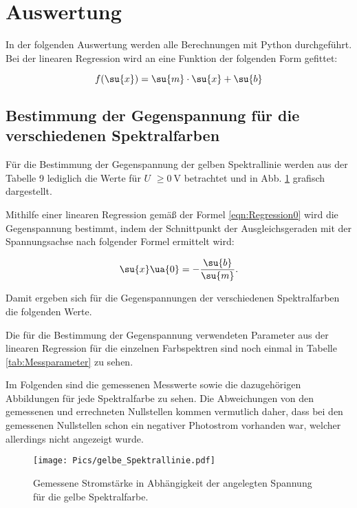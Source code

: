\section{Auswertung}

In der folgenden Auswertung werden alle Berechnungen mit Python durchgeführt.
Bei der linearen Regression wird an eine Funktion der folgenden Form gefittet:

\begin{equation}
  \label{eqn:Regression0}
  f(\su{x}) = \su{m} \cdot \su{x} + \su{b}
\end{equation}


\subsection{Bestimmung der Gegenspannung für die verschiedenen Spektralfarben}

Für die Bestimmung der Gegenspannung der gelben Spektrallinie werden aus der Tabelle
9 lediglich die Werte für $U$ $\geq \SI{0}{\volt}$ betrachtet und in
Abb. \ref{fig:Gelb} grafisch dargestellt.

Mithilfe einer linearen Regression gemäß der Formel \eqref{eqn:Regression0} wird die
Gegenspannung bestimmt, indem der Schnittpunkt der Ausgleichsgeraden mit der
Spannungsachse nach folgender Formel ermittelt wird:

\begin{equation}
  \su{x}\ua{0} = - \frac{\su{b}}{\su{m}}.
\end{equation}

Damit ergeben sich für die Gegenspannungen der verschiedenen Spektralfarben
die folgenden Werte.



Die für die Bestimmung der Gegenspannung verwendeten Parameter aus der linearen
Regression für die einzelnen Farbspektren sind noch einmal in Tabelle
\ref{tab:Messparameter} zu sehen.

Im Folgenden sind die gemessenen Messwerte sowie die dazugehörigen
Abbildungen für jede Spektralfarbe zu sehen. Die Abweichungen von den gemessenen und
errechneten Nullstellen kommen vermutlich daher, dass bei den gemessenen Nullstellen
schon ein negativer Photostrom vorhanden war, welcher allerdings nicht angezeigt
wurde.

\newpage



\begin{figure}
  \centering
  \texttt{[image: Pics/gelbe\_Spektrallinie.pdf]} \\[0cm]
  \caption{Gemessene Stromstärke in Abhängigkeit der angelegten Spannung für die
           gelbe Spektralfarbe.}
  \label{fig:Gelb}
\end{figure}

